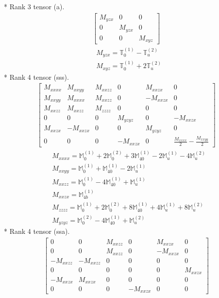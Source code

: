 \documentclass[fleqn,8pt,landscape]{jsarticle}
\begin{document}
* Rank 3 tensor (a).
\begin{align*}
\begin{bmatrix} M_{yzx} & 0 & 0 \\ 0 & M_{yzx} & 0 \\ 0 & 0 & M_{xyz} \end{bmatrix}
\end{align*}
\begin{align*}
& M_{yzx} = \mathbb{T}_{0}^{(1)} - \mathbb{T}_{u}^{(2)} \\
& M_{xyz} = \mathbb{T}_{0}^{(1)} + 2 \mathbb{T}_{u}^{(2)}
\end{align*}
* Rank 4 tensor (sss).
\begin{align*}
\begin{bmatrix} M_{xxxx} & M_{xxyy} & M_{xxzz} & 0 & M_{xxzx} & 0 \\ M_{xxyy} & M_{xxxx} & M_{xxzz} & 0 & - M_{xxzx} & 0 \\ M_{xxzz} & M_{xxzz} & M_{zzzz} & 0 & 0 & 0 \\ 0 & 0 & 0 & M_{yzyz} & 0 & - M_{xxzx} \\ M_{xxzx} & - M_{xxzx} & 0 & 0 & M_{yzyz} & 0 \\ 0 & 0 & 0 & - M_{xxzx} & 0 & \frac{M_{xxxx}}{2} - \frac{M_{xxyy}}{2} \end{bmatrix}
\end{align*}
\begin{align*}
& M_{xxxx} = \mathbb{M}_{0}^{(1)} + 2 \mathbb{M}_{0}^{(2)} + 3 \mathbb{M}_{40}^{(1)} - 2 \mathbb{M}_{u}^{(1)} - 4 \mathbb{M}_{u}^{(2)} \\
& M_{xxyy} = \mathbb{M}_{0}^{(1)} + \mathbb{M}_{40}^{(1)} - 2 \mathbb{M}_{u}^{(1)} \\
& M_{xxzz} = \mathbb{M}_{0}^{(1)} - 4 \mathbb{M}_{40}^{(1)} + \mathbb{M}_{u}^{(1)} \\
& M_{xxzx} = \mathbb{M}_{4b}^{(1)} \\
& M_{zzzz} = \mathbb{M}_{0}^{(1)} + 2 \mathbb{M}_{0}^{(2)} + 8 \mathbb{M}_{40}^{(1)} + 4 \mathbb{M}_{u}^{(1)} + 8 \mathbb{M}_{u}^{(2)} \\
& M_{yzyz} = \mathbb{M}_{0}^{(2)} - 4 \mathbb{M}_{40}^{(1)} + \mathbb{M}_{u}^{(2)}
\end{align*}
* Rank 4 tensor (ssa).
\begin{align*}
\begin{bmatrix} 0 & 0 & M_{xxzz} & 0 & M_{xxzx} & 0 \\ 0 & 0 & M_{xxzz} & 0 & - M_{xxzx} & 0 \\ - M_{xxzz} & - M_{xxzz} & 0 & 0 & 0 & 0 \\ 0 & 0 & 0 & 0 & 0 & M_{xxzx} \\ - M_{xxzx} & M_{xxzx} & 0 & 0 & 0 & 0 \\ 0 & 0 & 0 & - M_{xxzx} & 0 & 0 \end{bmatrix}
\end{align*}
\end{document}
